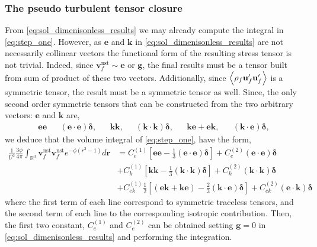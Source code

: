 \subsubsection{The pseudo turbulent tensor closure}

From \ref{eq:sol_dimenisonless_results} we may already compute the integral in \ref{eq:step_one}. 
However, as $\textbf{e}$ and $\textbf{k}$ in \ref{eq:sol_dimenisonless_results}  are not necessarily collinear vectors the functional form of the resulting stress tensor is not trivial. 
Indeed, since $\textbf{v}_f^\text{nst}\sim \textbf{e}$ or $\textbf{g}$, the final results must be a tensor built from sum of product of these two vectors.  
Additionally, since $\left<\rho_f \textbf{u}_f'\textbf{u}_f'\right>$ is a symmetric tensor, the result must be a symmetric tensor as well. 
Since, the only second order symmetric tensors that can be constructed from the  two arbitrary vectors: $\textbf{e}$ and $\textbf{k}$ are, 
\begin{align*}
    \textbf{ee}
    && (\textbf{e}\cdot \textbf{e})\bm\delta, 
    && \textbf{kk},
    && (\textbf{k}\cdot \textbf{k})\bm\delta,
    && \textbf{ke}+\textbf{ek},
    && (\textbf{k}\cdot \textbf{e})\bm\delta, 
\end{align*}
we deduce that the volume integral of \ref{eq:step_one}, have the form, 
\begin{align}
    \frac{1}{U^2}
    \frac{3\phi}{4\pi}\int_{\mathbb{R}^3}
    \textbf{v}_f^\text{nst}
    \textbf{v}_f^\text{nst}
     e^{-\phi(r^3 -1)}
    d\textbf{r}
    &= C^{(1)}_e \left[
        \textbf{ee}
         - \frac{1}{3}(\textbf{e}\cdot \textbf{e})\bm\delta
    \right]
    + C^{(2)}_e 
    (\textbf{e}\cdot \textbf{e})\bm\delta \nonumber \\
    &+ C^{(1)}_k \left[
        \textbf{kk}
         - \frac{1}{3}(\textbf{k}\cdot \textbf{k})\bm\delta
    \right]
    + C^{(2)}_k 
    (\textbf{k}\cdot \textbf{k})\bm\delta \nonumber \\
    &+ C^{(1)}_{ek} \frac{1}{2}\left[
        (\textbf{ek}  + \textbf{ke})
         - \frac{2}{3}(\textbf{k}\cdot \textbf{e})\bm\delta
    \right]
    + C^{(2)}_{ek} 
    (\textbf{e}\cdot \textbf{k})\bm\delta 
    \label{eq:functional_form}
\end{align}
where the first term of each line correspond to symmetric traceless tensors, and the second term of each line to the corresponding isotropic contribution. 
Then, the first two constant, $C^{(1)}_e$ and $C^{(2)}_e$ can be obtained setting $\textbf{g}= 0$ in \ref{eq:sol_dimenisonless_results} and performing the integration. 
